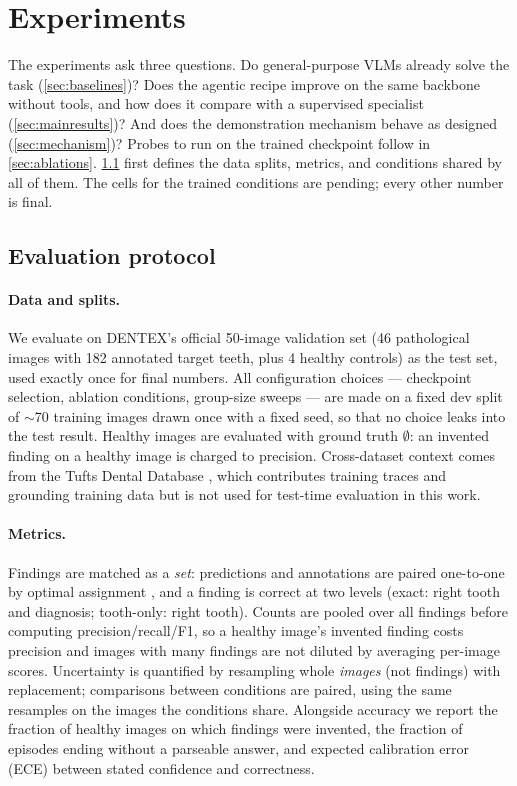 \section{Experiments}
\label{sec:experiments}

The experiments ask three questions. Do general-purpose VLMs already solve the task (\cref{sec:baselines})? Does the
agentic recipe improve on the same backbone without tools, and how does it compare with a supervised specialist
(\cref{sec:mainresults})? And does the demonstration mechanism behave as designed (\cref{sec:mechanism})? Probes to run on
the trained checkpoint follow in \cref{sec:ablations}. \cref{sec:eval} first defines the data splits, metrics, and
conditions shared by all of them. The cells for the trained conditions are pending; every other number is final.

\subsection{Evaluation protocol}
\label{sec:eval}

\paragraph{Data and splits.}
We evaluate on DENTEX's official 50-image validation set (46 pathological images with 182
annotated target teeth, plus 4 healthy controls) as the test set, used exactly once for final
numbers. All configuration choices --- checkpoint selection, ablation conditions, group-size
sweeps --- are made on a fixed dev split of $\sim$70 training images drawn once with a fixed
seed, so that no choice leaks into the test result. Healthy images are evaluated with ground
truth $\emptyset$: an invented finding on a healthy image is charged to precision. Cross-dataset context comes from the Tufts Dental Database
\citep{panetta2022tufts}, which contributes training traces and grounding training data but is not
used for test-time evaluation in this work.

\paragraph{Metrics.}
Findings are matched as a \emph{set}: predictions and annotations are paired one-to-one by
optimal assignment \citep{kuhn1955hungarian}, and a finding is correct at two levels (exact:
right tooth and diagnosis; tooth-only: right tooth). Counts are pooled over all findings before
computing precision/recall/F1, so a healthy image's invented finding costs precision and images
with many findings are not diluted by averaging per-image scores. Uncertainty is quantified by
resampling whole \emph{images} (not findings) with replacement; comparisons between conditions
are paired, using the same resamples on the images the conditions share. Alongside accuracy we
report the fraction of healthy images on which findings were invented, the fraction of episodes
ending without a parseable answer, and expected calibration error (ECE) \citep{guo2017calibration}
between stated confidence and correctness.

